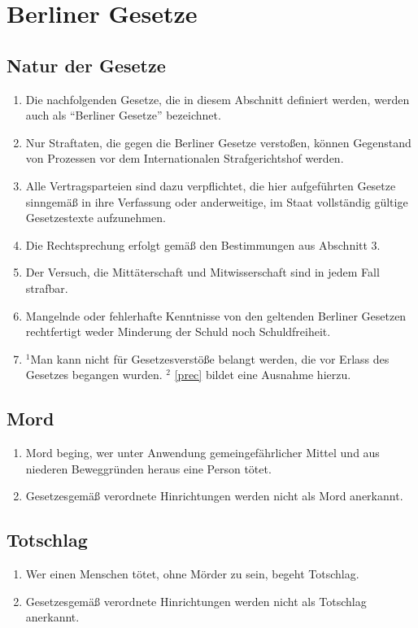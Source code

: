 \documentclass{article}
\begin{document}
\section{Berliner Gesetze}
\subsection{Natur der Gesetze}
\begin{enumerate}[(1)]
    \item Die nachfolgenden Gesetze, die in diesem Abschnitt definiert werden, werden auch als ``Berliner Gesetze'' bezeichnet.
    \item Nur Straftaten, die gegen die Berliner Gesetze verstoßen, können Gegenstand von Prozessen vor dem Internationalen Strafgerichtshof werden.
    \item Alle Vertragsparteien sind dazu verpflichtet, die hier aufgeführten Gesetze sinngemäß in ihre Verfassung oder anderweitige, im Staat vollständig gültige Gesetzestexte aufzunehmen.
    \item Die Rechtsprechung erfolgt gemäß den Bestimmungen aus Abschnitt 3.
    \item Der Versuch, die Mittäterschaft und Mitwisserschaft sind in jedem Fall strafbar.
    \item Mangelnde oder fehlerhafte Kenntnisse von den geltenden Berliner Gesetzen rechtfertigt weder Minderung der Schuld noch Schuldfreiheit.
    \item ${^1}$Man kann nicht für Gesetzesverstöße belangt werden, die vor Erlass des Gesetzes begangen wurden. ${^2}$ \ref{prec} bildet eine Ausnahme hierzu.
\end{enumerate}

\subsection{Mord}
\begin{enumerate}[(1)]
    \item Mord beging, wer unter Anwendung gemeingefährlicher Mittel und aus niederen Beweggründen heraus eine Person tötet.
    \item Gesetzesgemäß verordnete Hinrichtungen werden nicht als Mord anerkannt.
\end{enumerate}

\subsection{Totschlag}
\begin{enumerate}[(1)]
    \item Wer einen Menschen tötet, ohne Mörder zu sein, begeht Totschlag.
    \item Gesetzesgemäß verordnete Hinrichtungen werden nicht als Totschlag anerkannt.
\end{enumerate}
\end{document}
